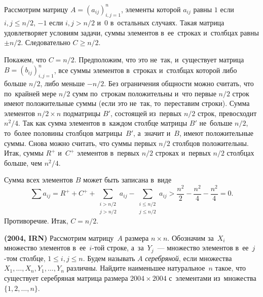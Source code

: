 \ifincludesolutions
Рассмотрим матрицу $A = (a_{ij})_{i,j=1}^n$, элементы которой $a_{ij}$ равны
$1$ если $i, j \leq n / 2$, $-1$ если $i, j > n / 2$ и~0 в~остальных случаях.
Такая матрица удовлетворяет условиям задачи, суммы элементов в~ее~строках
и~столбцах равны $\pm n/2$.
Следовательно $C\geq n/2$.

Покажем, что $C = n / 2$.
Предположим, что это не~так, и~существует матрица $B = (b_{ij})_{i,j=1}^n$,
все суммы элементов в~строках и~столбцах которой либо больше $n/2$, либо меньше
$- n / 2$.
Без ограничения общности можно считать, что по~крайней мере $n / 2$ сумм
по~строкам положительны и~что первые $n / 2$ строк имеют положительные суммы
(если это не~так, то~переставим строки).
Сумма элементов $n / 2 \times n$ подматрицы $B'$, состоящей из~первых $n/2$
строк, превосходит $n^2 / 4$.
Так как сумма элементов в~каждом столбце матрицы $B'$ не~больше $n/2$,
то~более половины столбцов матрицы~$B'$, а~значит и~$B$, имеют положительные
суммы.
Снова можно считать, что суммы первых $n/2$ столбцов положительны.
Итак, суммы $R^+$ и~$C^+$ элементов в~первых $n/2$ строках и~первых $n/2$
столбцах больше, чем $n^2/4$.
\par
Сумма всех элементов $B$ может быть записана в~виде
\[
    \sum a_{ij}
=
    {R^+} + {C^+}
    +
    \sum_{\substack{i > n / 2 \\ j > n / 2}}
        a_{ij}
    -
    \sum_{\substack{i \leq n / 2 \\ j \leq n / 2}}
        a_{ij}
>
    \frac{n^2}{2} - \frac{n^2}{4}  -\frac{n^2}{4}
=
    0
.\]
Противоречие.
Итак, $C = n / 2$.
\fi %

\begin{problems}

\item\textbf{(2004, IRN)}
Рассмотрим матрицу~$A$ размера $n \times n$.
Обозначим за~$X_i$ множество элементов в~ее~$i$-той строке, а~за~$Y_j$~---
множество элементов в~ее~$j$-том столбце, $1 \leq i, j \leq n$.
Будем называть $A$ \emph{серебряной}, если множества
$X_1, \ldots, X_n, Y_1, \ldots, Y_n$ различны.
Найдите наименьшее натуральное~$n$ такое, что существует серебряная матрица
размера $2004 \times 2004$ с~элементами из~множества $\{ 1, 2, \ldots, n \}$.

\end{problems}

